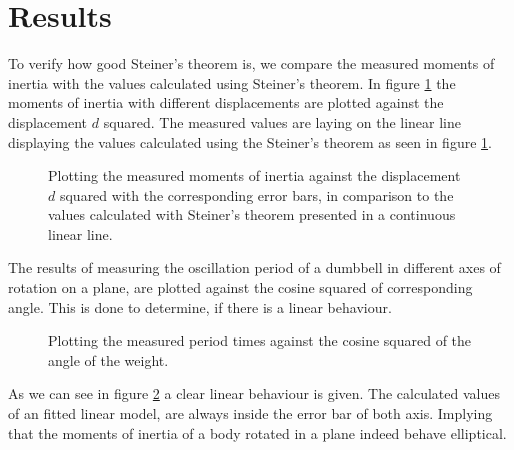 \section{Results}


To verify how good Steiner's theorem is, we compare the measured moments of inertia with the values calculated using Steiner's theorem.
In figure \ref{fig::stein} the moments of inertia with different displacements are plotted against the displacement $d$ squared.
The measured values are laying on the linear line displaying the values calculated using the Steiner's theorem as seen in figure \ref{fig::stein}. 

\begin{figure}[ht]
	\begin{center}
		
	\end{center}
	\caption{Plotting the measured moments of inertia against the displacement $d$ squared with the corresponding error bars, in comparison to the values calculated with Steiner's theorem presented in a continuous linear line.}\label{fig::stein}
\end{figure}


The results of measuring the oscillation period of a dumbbell in different axes of rotation on a plane, are plotted against the cosine squared of corresponding angle.
This is done to determine, if there is a linear behaviour. 

\begin{figure}[ht]
	\begin{center}
		
	\end{center}
	\caption{Plotting the measured period times against the cosine squared of the angle of the weight. }\label{fig::ellips}
\end{figure}

As we can see in figure \ref{fig::ellips} a clear linear behaviour is given.
The calculated values of an fitted linear model, are always inside the error bar of both axis.
Implying that the moments of inertia of a body rotated in a plane indeed behave elliptical.
